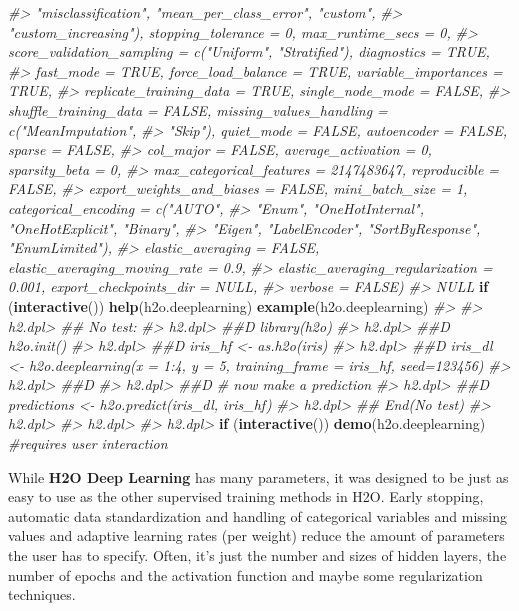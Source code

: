 \documentclass[]{book}
\newenvironment{Shaded}{\begin{snugshade}}{\end{snugshade}}
\newcommand{\CommentTok}[1]{\textcolor[rgb]{0.56,0.35,0.01}{\textit{#1}}}
\newcommand{\ControlFlowTok}[1]{\textcolor[rgb]{0.13,0.29,0.53}{\textbf{#1}}}
\newcommand{\KeywordTok}[1]{\textcolor[rgb]{0.13,0.29,0.53}{\textbf{#1}}}
\newcommand{\NormalTok}[1]{#1}
\begin{document}
\begin{Shaded}
\begin{Highlighting}[]
\CommentTok{#>         "misclassification", "mean_per_class_error", "custom", }
\CommentTok{#>         "custom_increasing"), stopping_tolerance = 0, max_runtime_secs = 0, }
\CommentTok{#>     score_validation_sampling = c("Uniform", "Stratified"), diagnostics = TRUE, }
\CommentTok{#>     fast_mode = TRUE, force_load_balance = TRUE, variable_importances = TRUE, }
\CommentTok{#>     replicate_training_data = TRUE, single_node_mode = FALSE, }
\CommentTok{#>     shuffle_training_data = FALSE, missing_values_handling = c("MeanImputation", }
\CommentTok{#>         "Skip"), quiet_mode = FALSE, autoencoder = FALSE, sparse = FALSE, }
\CommentTok{#>     col_major = FALSE, average_activation = 0, sparsity_beta = 0, }
\CommentTok{#>     max_categorical_features = 2147483647, reproducible = FALSE, }
\CommentTok{#>     export_weights_and_biases = FALSE, mini_batch_size = 1, categorical_encoding = c("AUTO", }
\CommentTok{#>         "Enum", "OneHotInternal", "OneHotExplicit", "Binary", }
\CommentTok{#>         "Eigen", "LabelEncoder", "SortByResponse", "EnumLimited"), }
\CommentTok{#>     elastic_averaging = FALSE, elastic_averaging_moving_rate = 0.9, }
\CommentTok{#>     elastic_averaging_regularization = 0.001, export_checkpoints_dir = NULL, }
\CommentTok{#>     verbose = FALSE) }
\CommentTok{#> NULL}
\ControlFlowTok{if}\NormalTok{ (}\KeywordTok{interactive}\NormalTok{()) }\KeywordTok{help}\NormalTok{(h2o.deeplearning)}
\KeywordTok{example}\NormalTok{(h2o.deeplearning)}
\CommentTok{#> }
\CommentTok{#> h2.dpl> ## No test: }
\CommentTok{#> h2.dpl> ##D library(h2o)}
\CommentTok{#> h2.dpl> ##D h2o.init()}
\CommentTok{#> h2.dpl> ##D iris_hf <- as.h2o(iris)}
\CommentTok{#> h2.dpl> ##D iris_dl <- h2o.deeplearning(x = 1:4, y = 5, training_frame = iris_hf, seed=123456)}
\CommentTok{#> h2.dpl> ##D }
\CommentTok{#> h2.dpl> ##D # now make a prediction}
\CommentTok{#> h2.dpl> ##D predictions <- h2o.predict(iris_dl, iris_hf)}
\CommentTok{#> h2.dpl> ## End(No test)}
\CommentTok{#> h2.dpl> }
\CommentTok{#> h2.dpl> }
\CommentTok{#> h2.dpl>}
\ControlFlowTok{if}\NormalTok{ (}\KeywordTok{interactive}\NormalTok{()) }\KeywordTok{demo}\NormalTok{(h2o.deeplearning)  }\CommentTok{#requires user interaction}
\end{Highlighting}
\end{Shaded}

While \textbf{H2O Deep Learning} has many parameters, it was designed to be just as easy to use as the other supervised training methods in H2O. Early stopping, automatic data standardization and handling of categorical variables and missing values and adaptive learning rates (per weight) reduce the amount of parameters the user has to specify. Often, it's just the number and sizes of hidden layers, the number of epochs and the activation function and maybe some regularization techniques.
\end{document}
